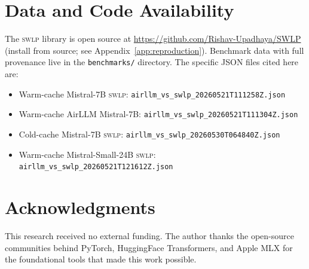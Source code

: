 \documentclass[10pt,a4paper]{article}
\newcommand{\swlp}{\textsc{swlp}}
\begin{document}
\section*{Data and Code Availability}
\label{sec:data}

The \swlp{} library is open source at \url{https://github.com/Rishav-Upadhaya/SWLP}
(install from source; see Appendix~\ref{app:reproduction}). Benchmark data with full provenance live in the
\texttt{benchmarks/} directory. The specific JSON files cited here are:

\begin{itemize}[leftmargin=2em]
  \item Warm-cache Mistral-7B \swlp{}: \texttt{airllm\_vs\_swlp\_20260521T111258Z.json}
  \item Warm-cache AirLLM Mistral-7B: \texttt{airllm\_vs\_swlp\_20260521T111304Z.json}
  \item Cold-cache Mistral-7B \swlp{}: \texttt{airllm\_vs\_swlp\_20260530T064840Z.json}
  \item Warm-cache Mistral-Small-24B \swlp{}: \texttt{airllm\_vs\_swlp\_20260521T121612Z.json}
\end{itemize}

\section*{Acknowledgments}

This research received no external funding. The author thanks the open-source
communities behind PyTorch, HuggingFace Transformers, and Apple MLX for the
foundational tools that made this work possible.
\end{document}
